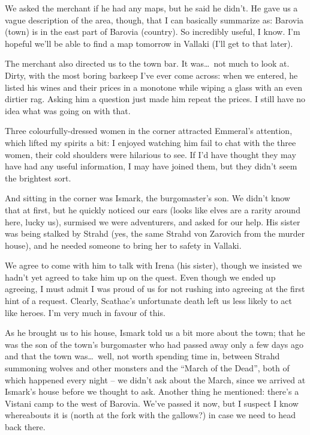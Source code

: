 We asked the merchant if he had any maps, but he said he didn't. He gave us a vague description of the area, though, that I can basically summarize as: Barovia (town) is in the east part of Barovia (country). So incredibly useful, I know. I'm hopeful we'll be able to find a map tomorrow in Vallaki (I'll get to that later).

The merchant also directed us to the town bar. It was\dots\ not much to look at. Dirty, with the most boring barkeep I've ever come across: when we entered, he listed his wines and their prices in a monotone while wiping a glass with an even dirtier rag. Asking him a question just made him repeat the prices. I still have no idea what was going on with that.

Three colourfully-dressed women in the corner attracted Emmeral's attention, which lifted my spirits a bit: I enjoyed watching him fail to chat with the three women, their cold shoulders were hilarious to see. If I'd have thought they may have had any useful information, I may have joined them, but they didn't seem the brightest sort.

And sitting in the corner was Ismark, the burgomaster's son. We didn't know that at first, but he quickly noticed our ears (looks like elves are a rarity around here, lucky us), surmised we were adventurers, and asked for our help. His sister was being stalked by Strahd (yes, the same Strahd von Zarovich from the murder house), and he needed someone to bring her to safety in Vallaki.

We agree to come with him to talk with Irena (his sister), though we insisted we hadn't yet agreed to take him up on the quest. Even though we ended up agreeing, I must admit I was proud of us for not rushing into agreeing at the first hint of a request. Clearly, Scathac's unfortunate death left us less likely to act like heroes. I'm very much in favour of this.

As he brought us to his house, Ismark told us a bit more about the town; that he was the son of the town's burgomaster who had passed away only a few days ago and that the town was\dots\ well, not worth spending time in, between Strahd summoning wolves and other monsters and the ``March of the Dead'', both of which happened every night -- we didn't ask about the March, since we arrived at Ismark's house before we thought to ask. Another thing he mentioned: there's a Vistani camp to the west of Barovia. We've passed it now, but I suspect I know whereabouts it is (north at the fork with the gallows?) in case we need to head back there.

